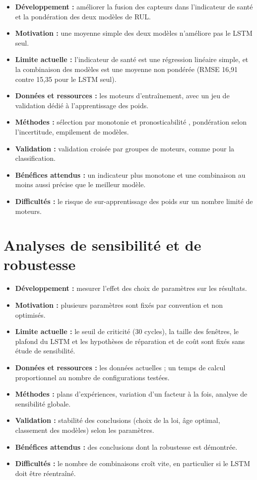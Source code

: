 \begin{itemize}
\item \textbf{Développement :} améliorer la fusion des capteurs dans l'indicateur de santé et la pondération des deux modèles de RUL.
\item \textbf{Motivation :} une moyenne simple des deux modèles n'améliore pas le LSTM seul.
\item \textbf{Limite actuelle :} l'indicateur de santé est une régression linéaire simple, et la combinaison des modèles est une moyenne non pondérée (RMSE 16,91 contre 15,35 pour le LSTM seul).
\item \textbf{Données et ressources :} les moteurs d'entraînement, avec un jeu de validation dédié à l'apprentissage des poids.
\item \textbf{Méthodes :} sélection par monotonie et pronosticabilité \cite{coble2009}, pondération selon l'incertitude, empilement de modèles.
\item \textbf{Validation :} validation croisée par groupes de moteurs, comme pour la classification.
\item \textbf{Bénéfices attendus :} un indicateur plus monotone et une combinaison au moins aussi précise que le meilleur modèle.
\item \textbf{Difficultés :} le risque de sur-apprentissage des poids sur un nombre limité de moteurs.
\end{itemize}

\section{Analyses de sensibilité et de robustesse}\label{sec:p-sensibilite}

\begin{itemize}
\item \textbf{Développement :} mesurer l'effet des choix de paramètres sur les résultats.
\item \textbf{Motivation :} plusieurs paramètres sont fixés par convention et non optimisés.
\item \textbf{Limite actuelle :} le seuil de criticité (30 cycles), la taille des fenêtres, le plafond du LSTM et les hypothèses de réparation et de coût sont fixés sans étude de sensibilité.
\item \textbf{Données et ressources :} les données actuelles ; un temps de calcul proportionnel au nombre de configurations testées.
\item \textbf{Méthodes :} plans d'expériences, variation d'un facteur à la fois, analyse de sensibilité globale.
\item \textbf{Validation :} stabilité des conclusions (choix de la loi, âge optimal, classement des modèles) selon les paramètres.
\item \textbf{Bénéfices attendus :} des conclusions dont la robustesse est démontrée.
\item \textbf{Difficultés :} le nombre de combinaisons croît vite, en particulier si le LSTM doit être réentraîné.
\end{itemize}

